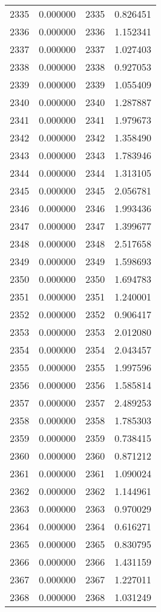 \documentclass[12pt]{article}
\begin{document}
\begin{longtable}{@{}cccc@{}}
2335 & 0.000000 & 2335 & 0.826451 \\
2336 & 0.000000 & 2336 & 1.152341 \\
2337 & 0.000000 & 2337 & 1.027403 \\
2338 & 0.000000 & 2338 & 0.927053 \\
2339 & 0.000000 & 2339 & 1.055409 \\
2340 & 0.000000 & 2340 & 1.287887 \\
2341 & 0.000000 & 2341 & 1.979673 \\
2342 & 0.000000 & 2342 & 1.358490 \\
2343 & 0.000000 & 2343 & 1.783946 \\
2344 & 0.000000 & 2344 & 1.313105 \\
2345 & 0.000000 & 2345 & 2.056781 \\
2346 & 0.000000 & 2346 & 1.993436 \\
2347 & 0.000000 & 2347 & 1.399677 \\
2348 & 0.000000 & 2348 & 2.517658 \\
2349 & 0.000000 & 2349 & 1.598693 \\
2350 & 0.000000 & 2350 & 1.694783 \\
2351 & 0.000000 & 2351 & 1.240001 \\
2352 & 0.000000 & 2352 & 0.906417 \\
2353 & 0.000000 & 2353 & 2.012080 \\
2354 & 0.000000 & 2354 & 2.043457 \\
2355 & 0.000000 & 2355 & 1.997596 \\
2356 & 0.000000 & 2356 & 1.585814 \\
2357 & 0.000000 & 2357 & 2.489253 \\
2358 & 0.000000 & 2358 & 1.785303 \\
2359 & 0.000000 & 2359 & 0.738415 \\
2360 & 0.000000 & 2360 & 0.871212 \\
2361 & 0.000000 & 2361 & 1.090024 \\
2362 & 0.000000 & 2362 & 1.144961 \\
2363 & 0.000000 & 2363 & 0.970029 \\
2364 & 0.000000 & 2364 & 0.616271 \\
2365 & 0.000000 & 2365 & 0.830795 \\
2366 & 0.000000 & 2366 & 1.431159 \\
2367 & 0.000000 & 2367 & 1.227011 \\
2368 & 0.000000 & 2368 & 1.031249 \\

\end{longtable}
\end{document}
